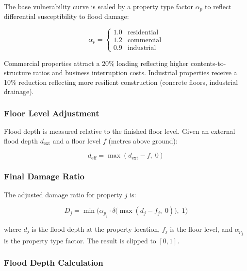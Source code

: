 \documentclass[11pt,a4paper]{article}
\begin{document}
The base vulnerability curve is scaled by a property type factor $\alpha_p$ to reflect
differential susceptibility to flood damage:

\begin{equation}
    \alpha_p = \begin{cases}
        1.0 & \text{residential} \\
        1.2 & \text{commercial} \\
        0.9 & \text{industrial}
    \end{cases}
    \label{eq:type_factor}
\end{equation}

\noindent Commercial properties attract a 20\% loading reflecting higher contents-to-structure
ratios and business interruption costs. Industrial properties receive a 10\% reduction
reflecting more resilient construction (concrete floors, industrial drainage).

\subsubsection{Floor Level Adjustment}

Flood depth is measured relative to the finished floor level. Given an external flood
depth $d_{\text{ext}}$ and a floor level $f$ (metres above ground):

\begin{equation}
    d_{\text{eff}} = \max(d_{\text{ext}} - f, \; 0)
    \label{eq:floor_adj}
\end{equation}

\subsubsection{Final Damage Ratio}

The adjusted damage ratio for property $j$ is:

\begin{equation}
    D_j = \min\!\Big(\alpha_{p_j} \cdot \delta\big(\max(d_j - f_j, \; 0)\big), \; 1\Big)
    \label{eq:final_damage}
\end{equation}

\noindent where $d_j$ is the flood depth at the property location, $f_j$ is the floor
level, and $\alpha_{p_j}$ is the property type factor. The result is clipped to $[0, 1]$.

\subsubsection{Flood Depth Calculation}
\end{document}
